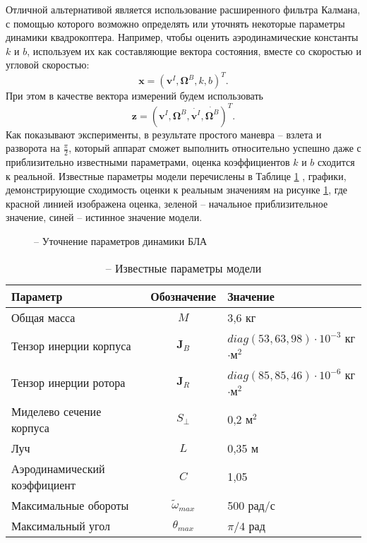 Отличной альтернативой является использование расширенного фильтра Калмана, с помощью которого возможно определять или уточнять некоторые параметры динамики квадрокоптера. Например, чтобы оценить аэродинамические константы $k$ и $b$, используем их как составляющие вектора состояния, вместе со скоростью и угловой скоростью:
\begin{equation}
\bm x = (\bm v^I, \bm \Omega^B, k, b)^T.
\end{equation}
При этом в качестве вектора измерений будем использовать
\begin{equation}
\bm z = (\bm v^I, \bm \Omega^B, \dot{\bm v^I}, \dot{\bm \Omega^B})^T.
\end{equation}
Как показывают эксперименты, в результате простого маневра -- взлета и разворота на $\frac{\pi}{2}$, который аппарат сможет выполнить относительно успешно даже с приблизительно известными параметрами, оценка коэффициентов $k$ и $b$
сходится к реальной. Известные параметры модели перечислены в Таблице \ref{tb:observer_params} , графики, демонстрирующие сходимость оценки к реальным значениям на рисунке \ref{fig:observer_k_b}, где красной линией изображена оценка, зеленой -- начальное приблизительное значение, синей -- истинное значение модели.
\begin{figure}[h!]
	\centering
	\quad
	\caption{ -- Уточнение параметров динамики БЛА}
	\label{fig:observer_k_b}
\end{figure}
\begin{table}[ht]
	\centering
	\caption{ -- Известные параметры модели}\label{tb:observer_params} 
	\begin{tabular}{lcl}
		\hline
		Параметр & Обозначение & Значение  \\\hline
		Общая масса & $M$ & 3,6 кг  \\
		Тензор инерции корпуса & $\bm J_B$ & $diag(53, 63, 98) \cdot{10^{-3}}$ кг$\cdot$м$^2$  \\
		Тензор инерции ротора & $\bm J_R$ & $diag(85, 85, 46) \cdot{10^{-6}}$ кг$\cdot$м$^2$  \\
		Миделево сечение корпуса & $S_{\perp}$ & 0,2 м$^2$ \\
		Луч & $L$ & 0,35 м \\
		Аэродинамический коэффициент & $C$ & 1,05\\	
		Максимальные обороты & $\tilde \omega_{max}$ & 500 рад/с \\		
		Максимальный угол & $\theta_{max}$ & ${\pi}/{4}$ рад \\
		\hline
	\end{tabular}
\end{table}
